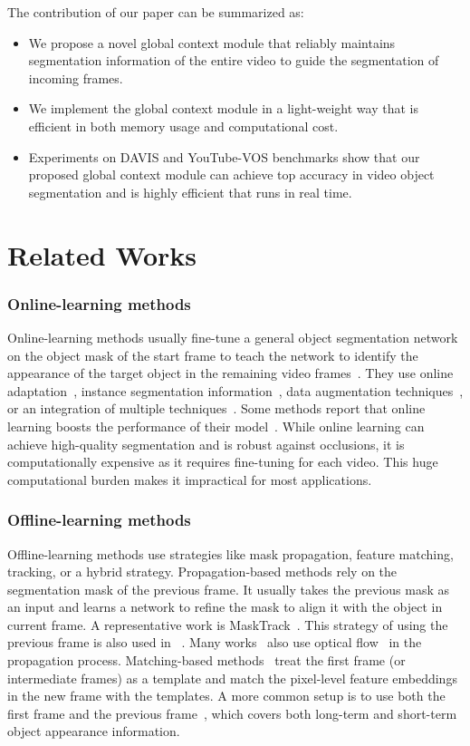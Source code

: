\documentclass[runningheads]{llncs}
\begin{document}
The contribution of our paper can be summarized as:

\begin{itemize}
\setlength{\itemsep}{0pt}
    \item We propose a novel global context module that reliably maintains segmentation information of the entire video to guide the segmentation of incoming frames.
    \item We implement the global context module in a light-weight way that is efficient in both memory usage and computational cost.
    \item Experiments on DAVIS and YouTube-VOS benchmarks show that our proposed global context module can achieve top accuracy in video object segmentation and is highly efficient that runs in real time.
\end{itemize}

\section{Related Works}
\label{sec:review}

\subsubsection{Online-learning methods}
Online-learning methods usually fine-tune a general object segmentation network on the object mask of the start frame to teach
the network to identify the appearance of the target object in the remaining video frames~\cite{osvos}. They use online adaptation~\cite{onavos}, instance segmentation information~\cite{osvoss}, data augmentation techniques~\cite{lucid}, or an integration of multiple techniques~\cite{premvos}. Some methods report that online learning boosts the performance of their model~\cite{dyenet,ranet}. While online learning can achieve high-quality segmentation and is robust against occlusions, it is computationally expensive as it requires fine-tuning for each video. This huge computational burden makes it impractical for most applications.

\subsubsection{Offline-learning methods}
Offline-learning methods use strategies like mask propagation, feature matching, tracking, or a hybrid strategy. Propagation-based methods rely on the segmentation mask of the previous frame. It usually takes the previous mask as an input and learns a network to refine the mask to align it with the object in current frame. A representative work is MaskTrack~\cite{masktrack}. This strategy of using the previous frame is also used in ~\cite{cinm,osmn}. Many works~\cite{cheng2017segflow,jang2017online,masktrack} also use optical flow~\cite{flownet,flownet2} in the propagation process. Matching-based methods~\cite{pml,videomatch,shin2017pixel,feelvos,ranet,rgmp} treat the first frame (or intermediate frames) as a template and match the pixel-level feature embeddings in the new frame with the templates. A more common setup is to use both the first frame and the previous frame~\cite{feelvos,ranet,rgmp}, which covers both long-term and short-term object appearance information.
\end{document}
